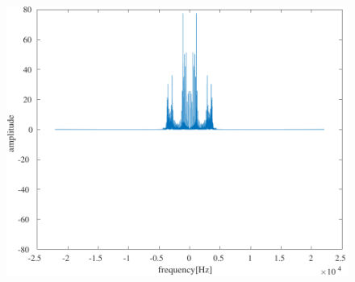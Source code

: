 \begin{figure}[h]
\begin{minipage}{.48\textwidth}
        \includegraphics[keepaspectratio,width=.9\textwidth]{Figures/fft_abs.pdf}
    \end{minipage}
\end{figure}
\section{\kadaibb}\label{sec:\kadaibb}